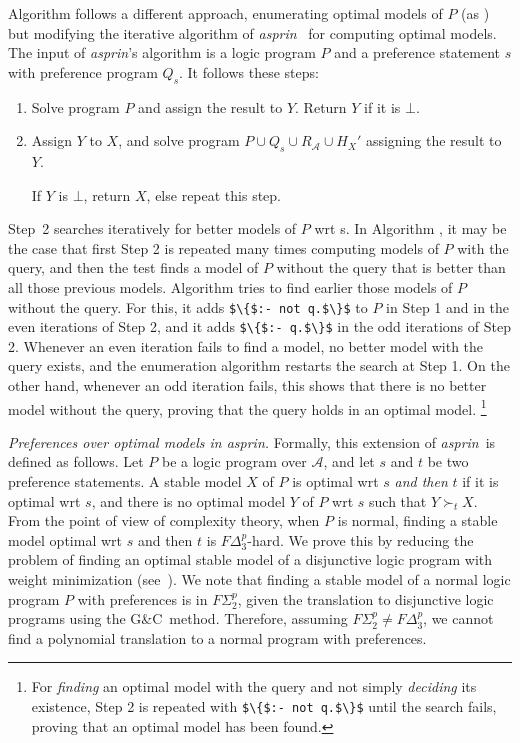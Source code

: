 \documentclass[a4paper,USenglish]{oasics-v2016}
\newcommand{\lm}[1]{\lstinline[mathescape=true]!#1!}
\newcommand{\gc}[0]{G{\&}C}
\newcommand{\sysfont}{\textit}
\newcommand{\asprin}{\sysfont{asprin}}
\newcommand{\Qlabel}[1]{\textcolor{darkgray}{\small\sffamily\bfseries\mathversion{bold}{Q-#1}}}
\begin{document}
Algorithm \Qlabel{4} follows a different approach, enumerating optimal models of $P$ (as \Qlabel{2}) 
but modifying the iterative algorithm of \asprin\ \cite{brderosc15a} for computing optimal models.
%
The input of \asprin's algorithm is a logic program $P$ and a preference statement $s$ with preference program $Q_s$.
%
It follows these steps:
\begin{enumerate}
\item
Solve program $P$ and assign the result to $Y$. Return $Y$ if it is $\bot$.
\item
Assign $Y$ to $X$, and solve program $P \cup Q_s \cup R_\mathcal{A} \cup H_{X}'$ assigning the result to $Y$.
\par
If $Y$ is $\bot$, return $X$, else repeat this step.
\end{enumerate}
%
Step~2 searches iteratively for better models of $P$ wrt s.
%
In Algorithm \Qlabel{3}, it may be the case that first Step 2 is repeated many times computing models of $P$ with the query, 
and then the test finds a model of $P$ without the query that is better than all those previous models.
%
Algorithm \Qlabel{4} tries to find earlier those models of $P$ without the query.
%
For this, it adds \lm{$\{$:- not q.$\}$} to $P$ in Step 1 and in the even iterations of Step 2, 
and it adds \lm{$\{$:- q.$\}$} in the odd iterations of Step 2.
%
Whenever an even iteration fails to find a model, no better model with the query exists, 
and the enumeration algorithm restarts the search at Step 1.
%
On the other hand, whenever an odd iteration fails, 
this shows that there is no better model without the query, 
proving that the query holds in an optimal model.%
\footnote{For \emph{finding} an optimal model with the query and not simply \emph{deciding} its existence, 
Step 2 is repeated with \lm{$\{$:- not q.$\}$} until the search fails, proving that an optimal model has been found.}

\emph{Preferences over optimal models in \asprin.}
%
Formally, this extension of \asprin\ is defined as follows.
%
Let $P$ be a logic program over $\mathcal{A}$, 
and let $s$ and $t$ be two preference statements.
%
A stable model $X$ of $P$ is optimal wrt $s$ \emph{and then} $t$ if
it is optimal wrt $s$, 
and there is no optimal model $Y$ of $P$ wrt $s$ such that $Y \succ_t X$.
%
From the point of view of complexity theory, when $P$ is normal, 
finding a stable model optimal wrt $s$ and then $t$ is $F\Delta^p_3$-hard.
We prove this by reducing the problem of finding an optimal stable model of a 
disjunctive logic program with weight minimization (see~\cite{roscwa16b}). %
%
We note that finding a stable model of a normal logic program $P$ with preferences 
is in $F\Sigma^p_2$, given the translation to disjunctive logic programs using the \gc\ method.
%
Therefore, assuming $F\Sigma^p_2 \neq F\Delta^p_3$, 
we cannot find a polynomial translation to a normal program with preferences.
%
\end{document}
